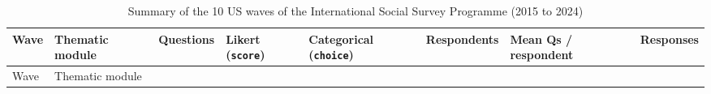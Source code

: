\documentclass[
  letterpaper,
  DIV=11,
  numbers=noendperiod]{scrartcl}
\begin{document}
{\def\LTcaptype{apptbl}
\begin{longtable}[]{@{}
  >{\raggedright\arraybackslash}p{}
  >{\raggedright\arraybackslash}p{}
  >{\raggedleft\arraybackslash}p{}
  >{\raggedleft\arraybackslash}p{}
  >{\raggedleft\arraybackslash}p{}
  >{\raggedleft\arraybackslash}p{}
  >{\raggedleft\arraybackslash}p{}
  >{\raggedleft\arraybackslash}p{}@{}}
\caption{{\label{apptbl-issp-waves}}Summary of the 10 US waves of the
International Social Survey Programme (2015 to 2024)}\tabularnewline
\toprule\noalign{}
\begin{minipage}[b]{\linewidth}\raggedright
Wave
\end{minipage} & \begin{minipage}[b]{\linewidth}\raggedright
Thematic module
\end{minipage} & \begin{minipage}[b]{\linewidth}\raggedleft
Questions
\end{minipage} & \begin{minipage}[b]{\linewidth}\raggedleft
Likert (\texttt{score})
\end{minipage} & \begin{minipage}[b]{\linewidth}\raggedleft
Categorical (\texttt{choice})
\end{minipage} & \begin{minipage}[b]{\linewidth}\raggedleft
Respondents
\end{minipage} & \begin{minipage}[b]{\linewidth}\raggedleft
Mean Qs / respondent
\end{minipage} & \begin{minipage}[b]{\linewidth}\raggedleft
Responses
\end{minipage} \\
\midrule\noalign{}
\endfirsthead
\toprule\noalign{}
\begin{minipage}[b]{\linewidth}\raggedright
Wave
\end{minipage} & \begin{minipage}[b]{\linewidth}\raggedright
Thematic module
\end{minipage} & \begin{minipage}[b]{\linewidth}\raggedleft

\end{minipage}
\end{longtable}}
\end{document}
